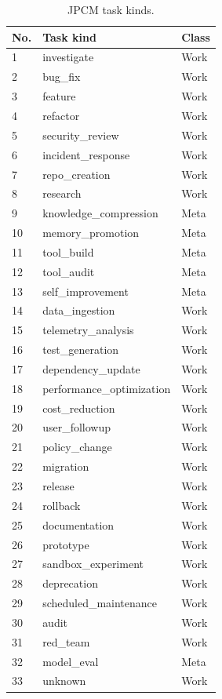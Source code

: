 \documentclass[journal,onecolumn]{IEEEtran}
\begin{document}
\begin{longtable}{p{}p{}p{}}
\caption{JPCM task kinds.}\\
\toprule
No. & Task kind & Class\\
\midrule
1 & investigate & Work\\
2 & bug\_fix & Work\\
3 & feature & Work\\
4 & refactor & Work\\
5 & security\_review & Work\\
6 & incident\_response & Work\\
7 & repo\_creation & Work\\
8 & research & Work\\
9 & knowledge\_compression & Meta\\
10 & memory\_promotion & Meta\\
11 & tool\_build & Meta\\
12 & tool\_audit & Meta\\
13 & self\_improvement & Meta\\
14 & data\_ingestion & Work\\
15 & telemetry\_analysis & Work\\
16 & test\_generation & Work\\
17 & dependency\_update & Work\\
18 & performance\_optimization & Work\\
19 & cost\_reduction & Work\\
20 & user\_followup & Work\\
21 & policy\_change & Work\\
22 & migration & Work\\
23 & release & Work\\
24 & rollback & Work\\
25 & documentation & Work\\
26 & prototype & Work\\
27 & sandbox\_experiment & Work\\
28 & deprecation & Work\\
29 & scheduled\_maintenance & Work\\
30 & audit & Work\\
31 & red\_team & Work\\
32 & model\_eval & Meta\\
33 & unknown & Work\\
\bottomrule
\end{longtable}
\end{document}
